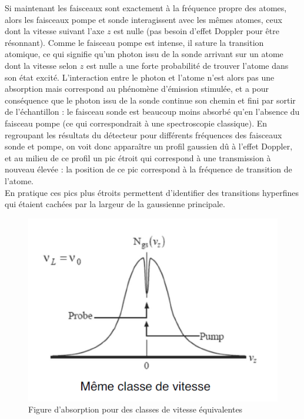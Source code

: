 Si maintenant les faisceaux sont exactement à la fréquence propre des atomes, alors les faisceaux pompe et sonde interagissent avec les mêmes atomes, ceux dont la vitesse suivant l'axe $z$ est nulle (pas besoin d'effet Doppler pour être résonnant). Comme le faisceau pompe est intense, il sature la transition atomique, ce qui signifie qu'un photon issu de la sonde arrivant sur un atome dont la vitesse selon $z$ est nulle a une forte probabilité de trouver l'atome dans son état excité. L'interaction entre le photon et l'atome n'est alors pas une absorption mais correspond au phénomène d'émission stimulée, et a pour conséquence que le photon issu de la sonde continue son chemin et fini par sortir de l'échantillon : le faisceau sonde est beaucoup moins absorbé qu'en l'absence du faisceau pompe (ce qui correspondrait à une spectroscopie classique). En regroupant les résultats du détecteur pour différents fréquences des faisceaux sonde et pompe, on voit donc apparaître un profil gaussien dû à l'effet Doppler, et au milieu de ce profil un pic étroit qui correspond à une transmission à nouveau élevée : la position de ce pic correspond à la fréquence de transition de l'atome.\\
En pratique ces pics plus étroits permettent d'identifier des transitions hyperfines qui étaient cachées par la largeur de la gaussienne principale.
\begin{figure}[tph]
    \centering
    \includegraphics[scale=1.0]{Images2/Vitesse1.PNG}
    \caption{Figure d'absorption pour des classes de vitesse équivalentes}
\label{fig:vit1}
\end{figure}


